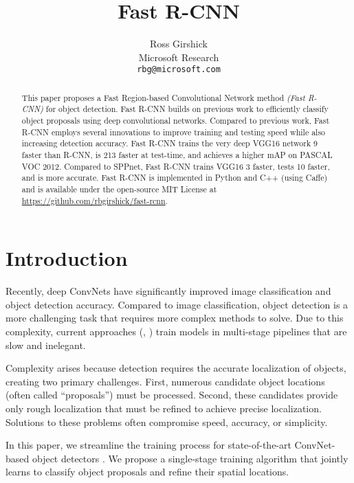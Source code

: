 \documentclass[10pt,twocolumn,letterpaper]{article}
\newcommand{\X}{\xspace}
\newcommand{\vggsixteen}{VGG16\xspace}
\begin{document}
\title{Fast R-CNN}

\author{Ross Girshick\\
Microsoft Research\\
{\tt\small rbg@microsoft.com}
}

\maketitle
\thispagestyle{empty}

\begin{abstract}
This paper proposes a Fast Region-based Convolutional Network method \emph{(Fast R-CNN)} for object detection.
Fast R-CNN builds on previous work to efficiently classify object proposals using deep convolutional networks.
Compared to previous work, Fast R-CNN employs several innovations to improve training and testing speed while also increasing detection accuracy.
Fast R-CNN trains the very deep \vggsixteen network 9\X faster than R-CNN, is 213\X faster at test-time, and achieves a higher mAP on PASCAL VOC 2012.
Compared to SPPnet, Fast R-CNN trains \vggsixteen 3\X faster, tests 10\X faster, and is more accurate.
Fast R-CNN is implemented in Python and C++ (using Caffe) and is available under the open-source MIT License at \url{https://github.com/rbgirshick/fast-rcnn}.
\end{abstract}
 \section{Introduction}

Recently, deep ConvNets \cite{krizhevsky2012imagenet,lecun89e} have significantly improved image classification \cite{krizhevsky2012imagenet} and object detection \cite{girshick2014rcnn,overfeat} accuracy.
Compared to image classification, object detection is a more challenging task that requires more complex methods to solve.
Due to this complexity, current approaches (\eg, \cite{girshick2014rcnn,he2014spp,overfeat,Zhu2015segDeepM}) train models in multi-stage pipelines that are slow and inelegant.

Complexity arises because detection requires the accurate localization of objects, creating two primary challenges.
First, numerous candidate object locations (often called ``proposals'') must be processed.
Second, these candidates provide only rough localization that must be refined to achieve precise localization.
Solutions to these problems often compromise speed, accuracy, or simplicity.


In this paper, we streamline the training process for state-of-the-art ConvNet-based object detectors \cite{girshick2014rcnn,he2014spp}.
We propose a single-stage training algorithm that jointly learns to classify object proposals and refine their spatial locations.
\end{document}
